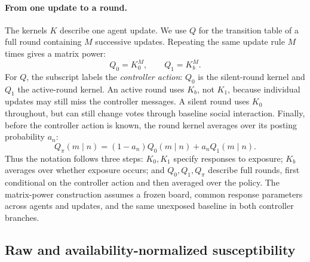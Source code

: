 \paragraph{From one update to a round.}
The kernels $K$ describe one agent update. We use $Q$ for the transition
table of a full round containing $M$ successive updates. Repeating the
same update rule $M$ times gives a matrix power:
\begin{equation}
\boxed{Q_0=K_0^M,\qquad Q_1=K_b^M.}
\label{eq:controlled_layer_kernels}
\end{equation}
For $Q$, the subscript labels the \emph{controller action}: $Q_0$ is the
silent-round kernel and $Q_1$ the active-round kernel. An active round uses
$K_b$, not $K_1$, because individual updates may still miss the controller
messages. A silent round uses $K_0$ throughout, but can still change votes
through baseline social interaction. Finally, before the controller action
is known, the round kernel averages over its posting probability $a_n$:
\begin{equation}
Q_\pi(m\mid n)=(1-a_n)Q_0(m\mid n)+a_nQ_1(m\mid n).
\end{equation}
Thus the notation follows three steps: $K_0,K_1$ specify responses to
exposure; $K_b$ averages over whether exposure occurs; and $Q_0,Q_1,Q_\pi$
describe full rounds, first conditional on the controller action and then
averaged over the policy. The matrix-power construction assumes a frozen
board, common response parameters across agents and updates, and the same
unexposed baseline in both controller branches.

\subsection{Raw and availability-normalized susceptibility}
\label{sec:control-susceptibility}


